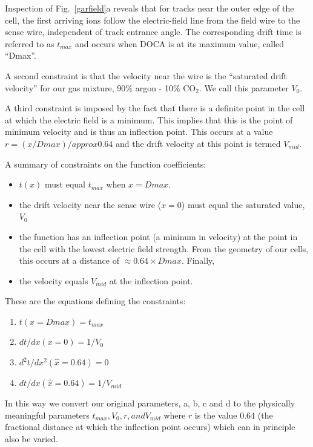 Inspection of  Fig.~\ref{garfield}a reveals that for tracks near the outer
edge of the cell, the first arriving ions follow the electric-field line from 
the field wire to the sense wire, independent of track entrance angle.  The
corresponding drift time is referred to as $t_{max}$ and occurs when DOCA is at its maximum value,
called ``Dmax''.

A second constraint is that the velocity near the wire is the ``saturated drift
velocity'' for our gas mixture, 90$\%$ argon - 10$\%$ CO$_2$.  We call this parameter $V_0$.

A third constraint is imposed by the fact that there is a definite point in the
cell at which the electric field is a minimum.  This implies that this is the point
of minimum velocity and is thus an inflection point.  This occurs at a value
$r = (x/Dmax) /approx 0.64$ and the drift velocity at this point is termed $V_{mid}$.

A summary of constraints on the function coefficients:
\begin{itemize}
\item  $t(x)$ must equal $t_{max}$ when $x = Dmax $.
\item  the drift velocity near the sense wire ($x = 0$)
must equal the saturated value, $V_0$
\item the function has an inflection point (a
mininum in velocity) at the point in the cell with the lowest electric field
strength.  From the geometry of our cells, this occurs at a distance
of $\approx 0.64 \times Dmax$.  Finally,
\item the velocity equals $V_{mid}$ at the inflection point.
\end{itemize}

These are the equations defining the constraints:
\begin{enumerate}
\item $t(x = Dmax) = t_{max}$
\item $dt / dx (x = 0) = 1 / V_0$
\item $d^2 t / dx^2 (\hat{x} = 0.64 ) = 0$   
\item $dt / dx (\hat{x} = 0.64 ) = 1/V_{mid}$  
\end{enumerate}

In this way we convert our original parameters, a, b, c and d to the physically meaningful
parameters $t_{max}, V_0, r, and V_{mid}$ where $r$ is the value 0.64 (the fractional distance
at which the inflection point occurs) which can in principle also be varied.


